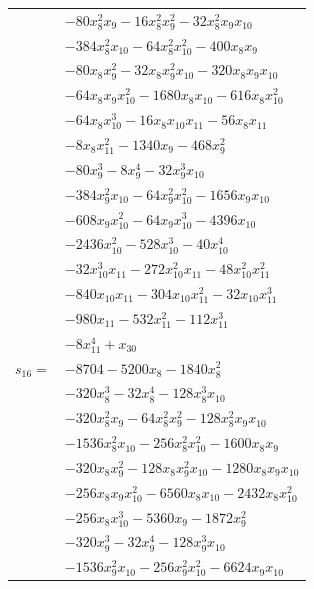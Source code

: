 \begin{longtable}{@{}r@{\;}l@{}}
 & \(\displaystyle -80x_{8}^{2}x_{9} -16x_{8}^{2}x_{9}^{2} -32x_{8}^{2}x_{9}x_{10}\) \\
 & \(\displaystyle -384x_{8}^{2}x_{10} -64x_{8}^{2}x_{10}^{2} -400x_{8}x_{9}\) \\
 & \(\displaystyle -80x_{8}x_{9}^{2} -32x_{8}x_{9}^{2}x_{10} -320x_{8}x_{9}x_{10}\) \\
 & \(\displaystyle -64x_{8}x_{9}x_{10}^{2} -1680x_{8}x_{10} -616x_{8}x_{10}^{2}\) \\
 & \(\displaystyle -64x_{8}x_{10}^{3} -16x_{8}x_{10}x_{11} -56x_{8}x_{11}\) \\
 & \(\displaystyle -8x_{8}x_{11}^{2} -1340x_{9} -468x_{9}^{2}\) \\
 & \(\displaystyle -80x_{9}^{3} -8x_{9}^{4} -32x_{9}^{3}x_{10}\) \\
 & \(\displaystyle -384x_{9}^{2}x_{10} -64x_{9}^{2}x_{10}^{2} -1656x_{9}x_{10}\) \\
 & \(\displaystyle -608x_{9}x_{10}^{2} -64x_{9}x_{10}^{3} -4396x_{10}\) \\
 & \(\displaystyle -2436x_{10}^{2} -528x_{10}^{3} -40x_{10}^{4}\) \\
 & \(\displaystyle -32x_{10}^{3}x_{11} -272x_{10}^{2}x_{11} -48x_{10}^{2}x_{11}^{2}\) \\
 & \(\displaystyle -840x_{10}x_{11} -304x_{10}x_{11}^{2} -32x_{10}x_{11}^{3}\) \\
 & \(\displaystyle -980x_{11} -532x_{11}^{2} -112x_{11}^{3}\) \\
 & \(\displaystyle -8x_{11}^{4} +x_{30}\) \\[3pt]
\(s_{16}=\) & \(\displaystyle -8704 -5200x_{8} -1840x_{8}^{2}\) \\
 & \(\displaystyle -320x_{8}^{3} -32x_{8}^{4} -128x_{8}^{3}x_{10}\) \\
 & \(\displaystyle -320x_{8}^{2}x_{9} -64x_{8}^{2}x_{9}^{2} -128x_{8}^{2}x_{9}x_{10}\) \\
 & \(\displaystyle -1536x_{8}^{2}x_{10} -256x_{8}^{2}x_{10}^{2} -1600x_{8}x_{9}\) \\
 & \(\displaystyle -320x_{8}x_{9}^{2} -128x_{8}x_{9}^{2}x_{10} -1280x_{8}x_{9}x_{10}\) \\
 & \(\displaystyle -256x_{8}x_{9}x_{10}^{2} -6560x_{8}x_{10} -2432x_{8}x_{10}^{2}\) \\
 & \(\displaystyle -256x_{8}x_{10}^{3} -5360x_{9} -1872x_{9}^{2}\) \\
 & \(\displaystyle -320x_{9}^{3} -32x_{9}^{4} -128x_{9}^{3}x_{10}\) \\
 & \(\displaystyle -1536x_{9}^{2}x_{10} -256x_{9}^{2}x_{10}^{2} -6624x_{9}x_{10}\) \\

\end{longtable}
